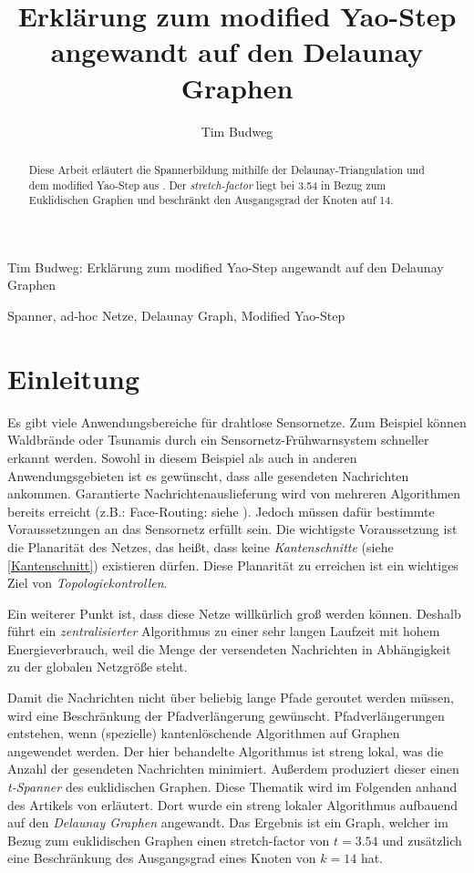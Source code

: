 \documentclass[a4paper,twoside]{IEEEtran}
\newcommand{\seminarteilnehmer}{Tim Budweg}
\newcommand{\seminartitel}{Erklärung zum modified Yao-Step angewandt auf den Delaunay Graphen}
\begin{document}
\title{\seminartitel}
\author{\seminarteilnehmer}

%
{\seminarteilnehmer: \seminartitel}


\maketitle

\begin{abstract}
\space Diese Arbeit erläutert die Spannerbildung mithilfe der Delaunay-Triangulation und dem modified Yao-Step aus \cite{kanj}. Der \emph{stretch-factor} liegt bei 3.54 in Bezug zum Euklidischen Graphen und beschränkt den Ausgangsgrad der Knoten auf 14.
\end{abstract}

\begin{IEEEkeywords}
\space Spanner, ad-hoc Netze, Delaunay Graph, Modified Yao-Step
\end{IEEEkeywords}


\section{Einleitung}
Es gibt viele Anwendungsbereiche für drahtlose Sensornetze. 
Zum Beispiel können Waldbrände oder Tsunamis durch ein Sensornetz-Frühwarnsystem schneller erkannt werden. 
Sowohl in diesem Beispiel als auch in anderen Anwendungsgebieten ist es gewünscht, dass alle gesendeten Nachrichten ankommen.
Garantierte Nachrichtenauslieferung wird von mehreren Algorithmen bereits erreicht (z.B.: Face-Routing: siehe \cite{FaceRouting}).
Jedoch müssen dafür bestimmte Voraussetzungen an das Sensornetz erfüllt sein. 
Die wichtigste Voraussetzung ist die Planarität des Netzes, das heißt, dass keine \emph{Kantenschnitte} (siehe \ref{Kantenschnitt}) existieren dürfen. 
Diese Planarität zu erreichen ist ein wichtiges Ziel von \emph{Topologiekontrollen}.

Ein weiterer Punkt ist, dass diese Netze willkürlich groß werden können.
Deshalb führt ein \emph{zentralisierter} Algorithmus zu einer sehr langen Laufzeit mit hohem Energieverbrauch, weil die Menge der versendeten Nachrichten in Abhängigkeit zu der globalen Netzgröße steht.

Damit die Nachrichten nicht über beliebig lange Pfade geroutet werden müssen, wird eine Beschränkung der Pfadverlängerung gewünscht. 
Pfadverlängerungen entstehen, wenn (spezielle) kantenlöschende Algorithmen auf Graphen angewendet werden.
Der hier behandelte Algorithmus ist streng lokal, was die Anzahl der gesendeten Nachrichten minimiert.
Außerdem produziert dieser einen \emph{t-Spanner} des euklidischen Graphen.
Diese Thematik wird im Folgenden anhand des Artikels von \cite{kanj} erläutert.
Dort wurde ein streng lokaler Algorithmus aufbauend auf den \emph{Delaunay Graphen} angewandt.
Das Ergebnis ist ein Graph, welcher im Bezug zum euklidischen Graphen einen stretch-factor von $t=3.54 $ und zusätzlich eine Beschränkung des Ausgangsgrad eines Knoten von $k=14 $ hat. %
\end{document}
